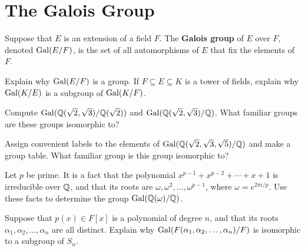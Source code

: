\section{The Galois Group}

\begin{definition}
    Suppose that $E$ is an extension of a field $F$. The \textbf{Galois group} of $E$ over $F$, denoted $\operatorname{Gal}(E/F)$, is the set of all automorphisms of $E$ that fix the elements of $F$.
\end{definition}

\begin{problem}
    Explain why $\operatorname{Gal}(E/F)$ is a group. If $F\subseteq E\subseteq K$ is a tower of fields, explain why $\operatorname{Gal}(K/E)$ is a subgroup of $\operatorname{Gal}(K/F)$.
\end{problem}

\begin{problem}
    Compute $\operatorname{Gal}(\mathbb{Q}(\sqrt{2},\sqrt{3})/\mathbb{Q}(\sqrt{2}))$ and $\operatorname{Gal}(\mathbb{Q}(\sqrt{2},\sqrt{3})/\mathbb{Q})$. What familiar groups are these groups isomorphic to?
\end{problem}

\begin{problem}
    Assign convenient labels to the elements of $\operatorname{Gal}(\mathbb{Q}(\sqrt{2},\sqrt{3},\sqrt{5})/\mathbb{Q})$ and make a group table. What familiar group is this group isomorphic to?
\end{problem}

\begin{problem}\label{prob:cyclotom}
    Let $p$ be prime. It is a fact that the polynomial $x^{p-1}+x^{p-2}+\cdots+x+1$ is irreducible over $\mathbb{Q}$, and that its roots are $\omega,\omega^2,\ldots,\omega^{p-1}$, where $\omega = e^{2\pi i/p}$. Use these facts to determine the group $\operatorname{Gal}(\mathbb{Q}(\omega)/\mathbb{Q})$.
\end{problem}

\begin{problem}\label{prob:galsubsn}
    Suppose that $p(x)\in F[x]$ is a polynomial of degree $n$, and that its roots $\alpha_1,\alpha_2,\ldots,\alpha_n$ are all distinct. Explain why $\operatorname{Gal}(F(\alpha_1,\alpha_2,\ldots,\alpha_n)/F)$ is isomorphic to a subgroup of $S_n$.
\begin{annotation}
\end{annotation}
\end{problem}


